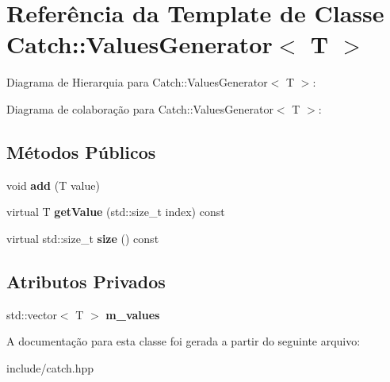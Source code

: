 \hypertarget{classCatch_1_1ValuesGenerator}{}\section{Referência da Template de Classe Catch\+:\+:Values\+Generator$<$ T $>$}
\label{classCatch_1_1ValuesGenerator}


Diagrama de Hierarquia para Catch\+:\+:Values\+Generator$<$ T $>$\+:


Diagrama de colaboração para Catch\+:\+:Values\+Generator$<$ T $>$\+:
\subsection*{Métodos Públicos}
\begin{DoxyCompactItemize}
\item 
void {\bfseries add} (T value)\hypertarget{classCatch_1_1ValuesGenerator_a8412c8ce5d9d4fc6ff06d5246d56d538}{}\label{classCatch_1_1ValuesGenerator_a8412c8ce5d9d4fc6ff06d5246d56d538}

\item 
virtual T {\bfseries get\+Value} (std\+::size\+\_\+t index) const \hypertarget{classCatch_1_1ValuesGenerator_a60599dd67096ff108471f64ee42acd9d}{}\label{classCatch_1_1ValuesGenerator_a60599dd67096ff108471f64ee42acd9d}

\item 
virtual std\+::size\+\_\+t {\bfseries size} () const \hypertarget{classCatch_1_1ValuesGenerator_a98a80bb0dd682c44e82e4a75e98c4682}{}\label{classCatch_1_1ValuesGenerator_a98a80bb0dd682c44e82e4a75e98c4682}

\end{DoxyCompactItemize}
\subsection*{Atributos Privados}
\begin{DoxyCompactItemize}
\item 
std\+::vector$<$ T $>$ {\bfseries m\+\_\+values}\hypertarget{classCatch_1_1ValuesGenerator_a626a864eae99afa1731457fd7802e1da}{}\label{classCatch_1_1ValuesGenerator_a626a864eae99afa1731457fd7802e1da}

\end{DoxyCompactItemize}


A documentação para esta classe foi gerada a partir do seguinte arquivo\+:\begin{DoxyCompactItemize}
\item 
include/catch.\+hpp\end{DoxyCompactItemize}
